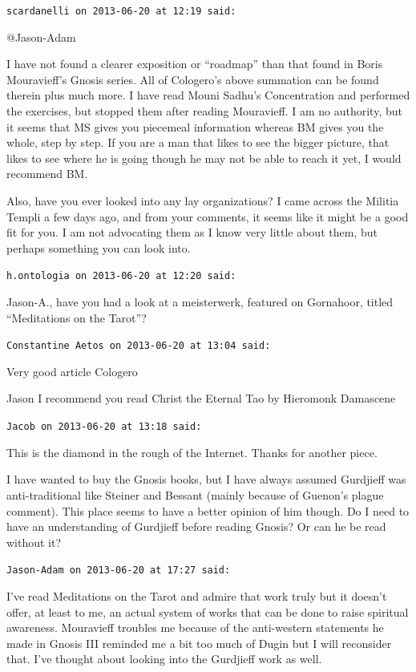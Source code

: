\begin{footnotesize}
\begin{sffamily}
\texttt{scardanelli on 2013-06-20 at 12:19 said:}

@Jason-Adam

I have not found a clearer exposition or ``roadmap'' than that found in Boris Mouravieff's Gnosis series. All of Cologero's above summation can be found therein plus much more. I have read Mouni Sadhu's Concentration and performed the exercises, but stopped them after reading Mouravieff. I am no authority, but it seems that MS gives you piecemeal information whereas BM gives you the whole, step by step. If you are a man that likes to see the bigger picture, that likes to see where he is going though he may not be able to reach it yet, I would recommend BM.

Also, have you ever looked into any lay organizations? I came across the Militia Templi a few days ago, and from your comments, it seems like it might be a good fit for you. I am not advocating them as I know very little about them, but perhaps something you can look into.

\hfill

\texttt{h.ontologia on 2013-06-20 at 12:20 said:}

Jason-A., have you had a look at a meisterwerk, featured on Gornahoor, titled ``Meditations on the Tarot''?

\hfill

\texttt{Constantine Aetos on 2013-06-20 at 13:04 said:}

Very good article Cologero

Jason I recommend you read Christ the Eternal Tao by Hieromonk Damascene

\hfill

\texttt{Jacob on 2013-06-20 at 13:18 said:}

This is the diamond in the rough of the Internet. Thanks for another piece.

I have wanted to buy the Gnosis books, but I have always assumed Gurdjieff was anti-traditional like Steiner and Bessant (mainly because of Guenon's plague comment). This place seems to have a better opinion of him though. Do I need to have an understanding of Gurdjieff before reading Gnosis? Or can he be read without it?

\hfill

\texttt{Jason-Adam on 2013-06-20 at 17:27 said:}

I've read Meditations on the Tarot and admire that work truly but it doesn't offer, at least to me, an actual system of works that can be done to raise spiritual awareness. Mouravieff troubles me because of the anti-western statements he made in Gnosis III reminded me a bit too much of Dugin but I will reconsider that. I've thought about looking into the Gurdjieff work as well.


\end{sffamily}
\end{footnotesize}
